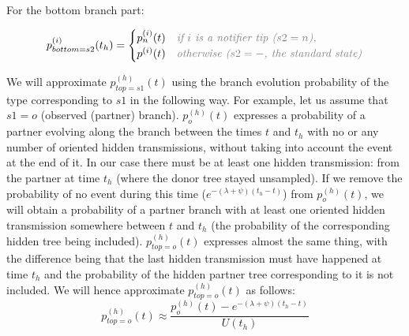 \documentclass[a4paper,10pt]{article}
\begin{document}
For the bottom branch part: 

\begin{equation}
p_{bottom=s2}^{(i)}(t_h) = 
\begin{cases}
p_n^{(i)}(t)&\textit{\color{gray} if $i$ is a notifier tip ($s2=n$),}\\
p^{(i)}(t)&\textit{\color{gray} otherwise ($s2=-$, the standard state)}\\
\end{cases}
\end{equation}

We will approximate $p_{top=s1}^{(h)}(t)$ using the branch evolution probability of the type corresponding to $s1$  in the following way. For example, let us assume that $s1=o$ (observed (partner) branch). $p_o^{(h)}(t)$ expresses a probability of a partner evolving along the branch between the times $t$ and $t_h$ with no or any number of oriented hidden transmissions, without taking into account the event at the end of it. In our case there must be at least one hidden transmission: from the partner at time $t_h$ (where the donor tree stayed unsampled). If we remove the probability of no event during this time ($e^{-(\lambda + \psi)(t_h - t)}$) from $p_o^{(h)}(t)$, we will obtain a probability of a partner branch with at least one oriented hidden transmission somewhere between $t$ and $t_h$ (the probability of the corresponding hidden tree being included). $p_{top=o}^{(h)}(t)$ expresses almost the same thing, with the difference being that the last hidden transmission must have happened at time $t_h$ and the probability of the hidden partner tree corresponding to it is not included. We will hence approximate $p_{top=o}^{(h)}(t)$ as follows: 
\begin{equation}
p_{top=o}^{(h)}(t) \approx \frac{p_o^{(h)}(t) -e^{-(\lambda + \psi)(t_{h} - t)}}{U(t_{h})}
\end{equation}
\end{document}
